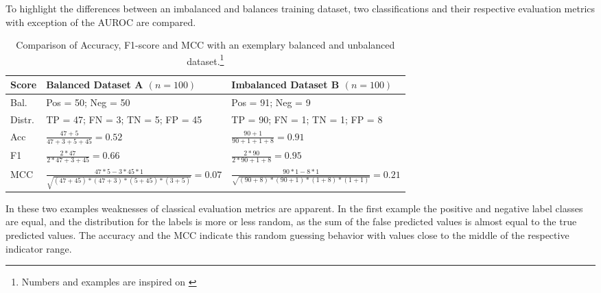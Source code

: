 

To highlight the differences between an imbalanced and balances training dataset, two classifications and their respective
evaluation metrics with exception of the \gls{AUROC} are compared.

\begin{table}[ht]
    \centering
    \begin{tabular}{@{}P{0.1\textwidth}P{0.38\textwidth}P{0.38\textwidth}@{}}
        \toprule
        Score  & Balanced Dataset A $(n = 100)$                                   & Imbalanced Dataset B  $(n = 100)$                            \\
        \midrule
        Bal.   & Pos = 50; Neg = 50                                               & Pos = 91; Neg = 9                                            \\
        \midrule
        Distr. & TP = 47; FN = 3; TN = 5; FP = 45                                 & TP = 90; FN = 1; TN = 1; FP = 8                              \\
        \midrule
        Acc    & $\frac{47 + 5}{47 + 3  + 5 + 45} = 0.52$                         & $\frac{90 + 1}{90 + 1  + 1 +8} = 0.91$                       \\
        \midrule
        F1     & $\frac{2* 47}{2*47 + 3 + 45} = 0.66$                             & $\frac{2 * 90}{2 * 90 + 1 +8} = 0.95$                        \\
        \midrule
        MCC    & $\frac{47*5 -3*45*1}{\sqrt{(47+45)*(47+3)*(5+45)*(3+5)}} = 0.07$ & $\frac{90*1 - 8*1}{\sqrt{(90+8)*(90+1)*(1+8)*(1+1)}} = 0.21$ \\
        \bottomrule
    \end{tabular}
    \caption[Comparison of Accuracy, F1-score and MCC with an exemplary balanced and unbalanced
        dataset.]{Comparison of Accuracy, F1-score and MCC with an exemplary balanced and unbalanced
        dataset.\footnote{Numbers and examples are inspired on \cite[p.9]{chicco_advantages_2020}}}
    \label{tab:indicator_comparison}
\end{table}
In these two examples weaknesses of classical evaluation metrics are apparent. In the first
example the positive and negative label classes are equal, and the distribution for the
labels is more or less random, as the sum of the false predicted values is almost equal to
the true predicted values. The accuracy and the \gls{MCC} indicate this random guessing
behavior with values close to the middle of the respective indicator range.
